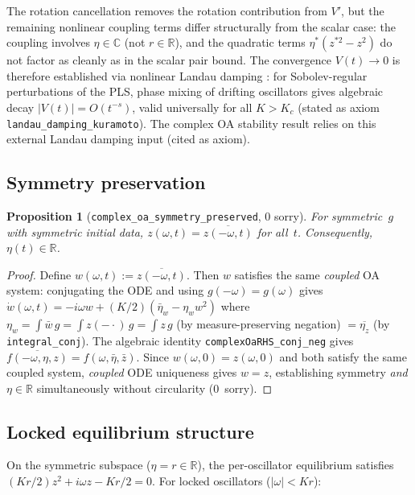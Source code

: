 \documentclass[11pt,a4paper]{article}
\newtheorem{proposition}[theorem]{Proposition}
\theoremstyle{definition}
\newcommand{\R}{\mathbb{R}}
\newcommand{\C}{\mathbb{C}}
\begin{document}
The rotation cancellation removes the rotation contribution from $V'$, but the remaining nonlinear coupling terms differ structurally from the scalar case: the coupling involves $\eta \in \C$ (not $r \in \R$), and the quadratic terms $\eta^*(z^{*2} - z^2)$ do not factor as cleanly as in the scalar pair bound. The convergence $V(t) \to 0$ is therefore established via nonlinear Landau damping \cite{dietert2017}: for Sobolev-regular perturbations of the PLS, phase mixing of drifting oscillators gives algebraic decay $|V(t)| = O(t^{-s})$, valid universally for all $K > K_c$ (stated as axiom \texttt{landau\_damping\_kuramoto}). The complex OA stability result relies on this external Landau damping input (cited as axiom).

\subsection{Symmetry preservation}

\begin{proposition}[\texttt{complex\_oa\_symmetry\_preserved}, 0 sorry]
For symmetric~$g$ with symmetric initial data, $z(\omega,t) = \overline{z(-\omega,t)}$ for all~$t$. Consequently, $\eta(t) \in \R$.
\end{proposition}
\begin{proof}
Define $w(\omega,t) := \overline{z(-\omega,t)}$. Then $w$ satisfies the same \emph{coupled} OA system: conjugating the ODE and using $g(-\omega) = g(\omega)$ gives $\dot w(\omega,t) = -i\omega w + (K/2)(\bar\eta_w - \eta_w w^2)$ where $\eta_w = \int \bar w\,g = \int z(-\cdot)\,g = \int z\,g$ (by measure-preserving negation) $= \overline{\eta_z}$ (by \texttt{integral\_conj}). The algebraic identity \texttt{complexOaRHS\_conj\_neg} gives $\overline{f(-\omega,\eta,z)} = f(\omega,\bar\eta,\bar z)$. Since $w(\omega,0) = z(\omega,0)$ and both satisfy the same coupled system, \emph{coupled} ODE uniqueness gives $w = z$, establishing symmetry \emph{and} $\eta \in \R$ simultaneously without circularity (0~sorry).
\end{proof}

\subsection{Locked equilibrium structure}

On the symmetric subspace ($\eta = r \in \R$), the per-oscillator equilibrium satisfies $(Kr/2)z^2 + i\omega z - Kr/2 = 0$. For locked oscillators ($|\omega| < Kr$):
\end{document}
